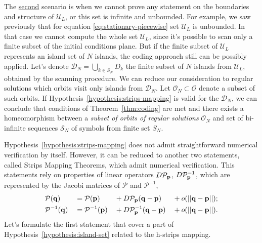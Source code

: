 The \underline{second} scenario is when we cannot prove any statement on the boundaries and structure of $\mathscr{U}_L$, or this set is infinite and unbounded.
For example, we saw previously that for equation \eqref{eq:stationary-piecewise} set $\mathscr{U}_L$ is unbounded.
In that case we cannot compute the whole set $\mathscr{U}_L$, since it's possible to scan only a finite subset of the initial conditions plane.
But if the finite subset of $\mathscr{U}_L$ represents an island set of $N$ islands, the coding approach still can be possibly applied.
Let's denote $\mathcal{D}_N = \bigcup_{k \in S_N} D_k$ the finite subset of $N$ islands from $\mathscr{U}_L$, obtained by the scanning procedure.
We can reduce our consideration to regular solutions which orbits visit only islands from $\mathcal{D}_N$.
Let $\mathcal{O}_N \subset \mathcal{O}$ denote a subset of such orbits.
If Hypothesis~\ref{hypothesis:strips-mapping} is valid for the $\mathcal{D}_N$, we can conclude that conditions of Theorem~\ref{thm:coding} are met and there exists a homeomorphism between a {\it subset of orbits of regular solutions} $\mathcal{O}_N$ and set of bi-infinite sequences $\mathcal{S}_N$ of symbols from finite set $S_N$.

Hypothesis~\ref{hypothesis:strips-mapping} does not admit straightforward numerical verification by itself.
However, it can be reduced to another two statements, called Strips Mapping Theorems, which admit numerical verification.
This statements rely on properties of linear operators $D \mathcal{P}_{\vb{p}}$, $D \mathcal{P}^{-1}_{\vb{p}}$, which are represented by the Jacobi matrices of $\mathcal{P}$ and $\mathcal{P}^{-1}$, 
\begin{alignat}{4}
	& \mathcal{P}(\vb{q}) && = \mathcal{P}(\vb{p}) && + D \mathcal{P}_{\vb{p}} (\vb{q} - \vb{p}) && + o(||\vb{q} - \vb{p}||); \\
	& \mathcal{P}^{-1}(\vb{q}) && = \mathcal{P}^{-1}(\vb{p}) && + D \mathcal{P}^{-1}_{\vb{p}} (\vb{q} - \vb{p}) && + o(||\vb{q} - \vb{p}||).
\end{alignat}
Let's formulate the first statement that cover a part of Hypothesis~\ref{hypothesis:island-set} related to the h-strips mapping.

